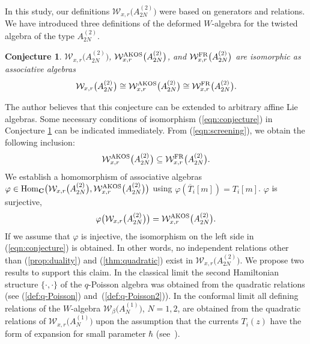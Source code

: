 \documentclass[10pt,a4paper]{amsart}
\numberwithin{equation}{section}
\newtheorem{Conjecture}[Theorem]{Conjecture}
 { \theoremstyle{definition}
\newtheorem{Definition}[Theorem]{Definition}
\newtheorem{Example}[Theorem]{Example}
\newtheorem{Remark}[Theorem]{Remark} }
\begin{document}
In this study, our definitions ${\mathcal W}_{x,r}\big(A_{2N}^{(2)}\big)$
were based on generators and relations.
We have introduced three definitions of the deformed $W$-algebra
for the twisted algebra of the type $A_{2N}^{(2)}$.

\begin{Conjecture}
\label{conj:5-1}
${\mathcal W}_{x,r}\big(A_{2N}^{(2)}\big)$,
${\mathcal W}_{x,r}^{\rm AKOS}\big(A_{2N}^{(2)}\big)$, and
${\mathcal W}_{x,r}^{\rm FR}\big(A_{2N}^{(2)}\big)$
are isomorphic as associative algebras
\begin{gather}
{\mathcal W}_{x,r}\big(A_{2N}^{(2)}\big)\cong
{\mathcal W}_{x,r}^{\rm AKOS}\big(A_{2N}^{(2)}\big)\cong
{\mathcal W}_{x,r}^{\rm FR}\big(A_{2N}^{(2)}\big).
\label{eqn:conjecture}
\end{gather}
\end{Conjecture}

The author believes that this conjecture can be extended to
arbitrary affine Lie algebras.
Some necessary conditions of isomorphism (\ref{eqn:conjecture})
in Conjecture \ref{conj:5-1}
can be indicated immediately.
From (\ref{eqn:screening}), we obtain the following inclusion:
\begin{gather*}
{\mathcal W}_{x,r}^{\rm AKOS}\big(A_{2N}^{(2)}\big) \subseteq
{\mathcal W}_{x,r}^{\rm FR}\big(A_{2N}^{(2)}\big).
\end{gather*}
We establish a homomorphism of associative algebras
$\varphi \in {\rm Hom}_{{\bf C}}\big({\mathcal W}_{x,r}\big(A_{2N}^{(2)}\big),
{\mathcal W}_{x,r}^{\rm AKOS}\big(A_{2N}^{(2)}\big)\big)$
using $\varphi(\overline{T}_i[m])=T_i[m]$. $\varphi$ is surjective,
\begin{gather*}
\varphi\big({\mathcal W}_{x,r}\big(A_{2N}^{(2)}\big)\big)
={\mathcal W}_{x,r}^{\rm AKOS}\big(A_{2N}^{(2)}\big).
\end{gather*}
If we assume that $\varphi$ is injective,
the isomorphism on the left side in (\ref{eqn:conjecture}) is obtained.
In other words, no independent relations other than (\ref{prop:duality})
and (\ref{thm:quadratic}) exist
in ${\mathcal W}_{x,r}\big(A_{2N}^{(2)}\big)$.
We propose two results to support this claim.
In the classical limit the second Hamiltonian structure $\{\cdot, \cdot\}$
of the $q$-Poisson algebra
\cite{Frenkel-Reshetikhin2,Frenkel-Reshetikhin1, Frenkel-Reshetikhin-Semenov,
Semenov-Sevostyanov}
was obtained from the quadratic relations
(see (\ref{def:q-Poisson}) and~(\ref{def:q-Poisson2})).
In the conformal limit all defining relations of the $W$-algebra
${\mathcal W}_\beta\big(A_N^{(1)}\big)$, $N=1, 2$,
are obtained from the quadratic relations of
${\mathcal W}_{x, r}\big(A_N^{(1)}\big)$ {upon the assumption
that the currents $T_i(z)$ have the form of expansion
for small parameter $\hbar$}
(see~\cite[Appendix]{Awata-Kubo-Odake-Shiraishi2}).
\end{document}
